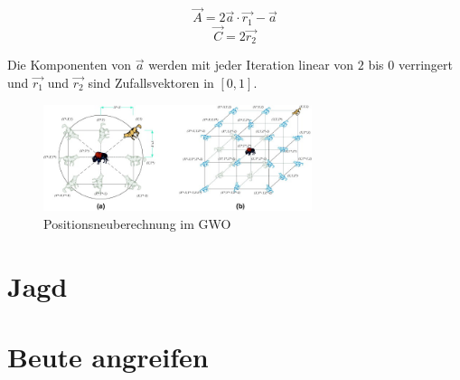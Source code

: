 \begin{equation}
    \vec{A} = 2 \vec{a} \cdot \vec{r_1} - \vec{a}
    \label{calcA}
\end{equation}
\begin{equation}
    \vec{C} = 2 \vec{r_2}
    \label{calcC}
\end{equation}

Die Komponenten von $\vec{a}$ werden mit jeder Iteration linear von $2$ bis $0$ verringert und $\vec{r_1}$ und $\vec{r_2}$ sind Zufallsvektoren in $[0,1]$.\\
\begin{figure}[ht]
    \begin{center}
        \includegraphics[width=0.7\textwidth]{assets/img/Updating_position_of_gray_wolves_in_GWO.jpg}
        \caption[Positionsneuberechnung im GWO]{Positionsneuberechnung im GWO \cite{MIRJALILI201446}}
        \label{gwo_newPos}
    \end{center}
\end{figure}

\section{Jagd}
\section{Beute angreifen}
